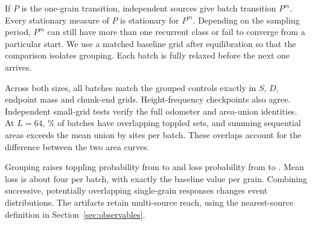 If $P$ is the one-grain transition, independent sources give batch transition $P^m$. Every stationary measure of $P$ is stationary for $P^m$. Depending on the sampling period, $P^m$ can still have more than one recurrent class or fail to converge from a particular start. We use a matched baseline grid after equilibration so that the comparison isolates grouping. Each batch is fully relaxed before the next one arrives.

Across both sizes, all  batches match the grouped controls exactly in $S$, $D$, endpoint mass and chunk-end grids. Height-frequency checkpoints also agree. Independent small-grid tests verify the full odometer and area-union identities. At $L=64$, \% of batches have overlapping toppled sets, and summing sequential areas exceeds the mean union by  sites per batch. These overlaps account for the difference between the two area curves.

Grouping raises toppling probability from  to  and loss probability from  to . Mean loss is about four per batch, with exactly the baseline value per grain. Combining successive, potentially overlapping single-grain responses changes event distributions. The artifacts retain multi-source reach, using the nearest-source definition in Section~\ref{sec:observables}.


